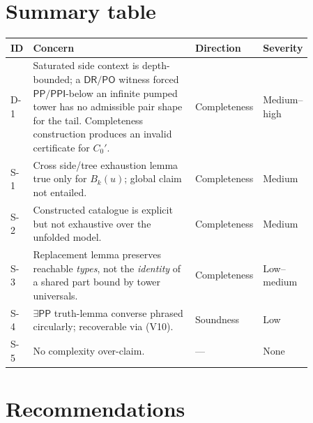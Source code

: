 \documentclass[11pt]{article}
\newcommand{\DR}{\mathsf{DR}}
\newcommand{\PO}{\mathsf{PO}}
\newcommand{\PP}{\mathsf{PP}}
\newcommand{\PPI}{\mathsf{PPI}}
\begin{document}
\section{Summary table}

\begin{center}
\renewcommand{\arraystretch}{1.25}
\begin{tabular}{p{0.05\linewidth}p{0.55\linewidth}p{0.13\linewidth}p{0.13\linewidth}}
\toprule
ID & Concern & Direction & Severity \\
\midrule
D-1 & Saturated side context is depth-bounded; a $\DR/\PO$ witness forced
$\PP/\PPI$-below an infinite pumped tower has no admissible pair shape for the
tail. Completeness construction produces an invalid certificate for $C_0'$.
& Completeness & Medium--high \\
S-1 & Cross side/tree exhaustion lemma true only for $B_k(u)$; global claim not
entailed. & Completeness & Medium \\
S-2 & Constructed catalogue is explicit but not exhaustive over the unfolded
model. & Completeness & Medium \\
S-3 & Replacement lemma preserves reachable \emph{types}, not the \emph{identity}
of a shared part bound by tower universals. & Completeness & Low--medium \\
S-4 & $\exists\PP$ truth-lemma converse phrased circularly; recoverable via
(V10). & Soundness & Low \\
S-5 & No complexity over-claim. & --- & None \\
\bottomrule
\end{tabular}
\end{center}

\section{Recommendations}
\end{document}
